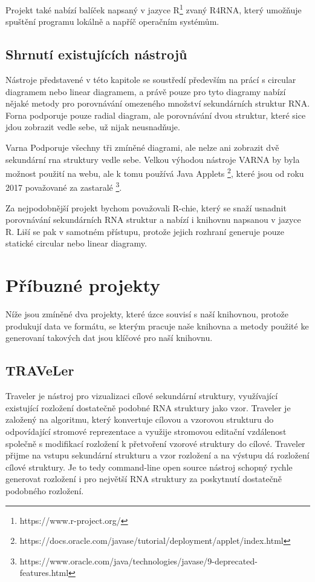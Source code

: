 Projekt také nabízí balíček napsaný v jazyce
R\footnote{https://www.r-project.org/} zvaný R4RNA, který umožňuje spuštění
programu lokálně a napříč operačním systémům.

\subsection{Shrnutí existujících nástrojů}

Nástroje představené v této kapitole se soustředí především na prácí s circular
diagramem nebo linear diagramem, a právě pouze pro tyto diagramy nabízí nějaké
metody pro porovnávání omezeného množství sekundárních struktur RNA. Forna
podporuje pouze radial diagram, ale porovnávání dvou struktur, které sice jdou
zobrazit vedle sebe, už nijak neusnadňuje. 

Varna Podporuje všechny tři zmíněné diagrami, ale nelze ani zobrazit dvě
sekundární rna struktury vedle sebe. Velkou výhodou nástroje VARNA by byla
možnost použití na webu, ale k tomu používá Java Applets
\footnote{https://docs.oracle.com/javase/tutorial/deployment/applet/index.html},
které jsou od roku 2017 považované za zastaralé
\footnote{https://www.oracle.com/java/technologies/javase/9-deprecated-features.html}.

Za nejpodobnější projekt bychom považovali R-chie, který se snaží usnadnit
porovnávání sekundárních RNA struktur a nabízí i knihovnu napsanou v jazyce R.
Liší se pak v samotném přístupu, protože jejich rozhraní generuje pouze
statické circular nebo linear diagramy.

\section{Příbuzné projekty} 

Níže jsou zmíněné dva projekty, které úzce souvisí s naší knihovnou, protože
produkují data ve formátu, se kterým pracuje naše knihovna a metody
použité ke generovaní takových dat jsou klíčové pro naší knihovnu.

\subsection{TRAVeLer} 

Traveler\cite{Traveler2017} je nástroj pro vizualizaci cílové sekundární
struktury, využívající existující rozložení dostatečně podobné RNA struktury
jako vzor. Traveler je založený na algoritmu, který konvertuje cílovou a
vzorovou strukturu do odpovídající stromové reprezentace a využije stromovou
editační vzdálenost společně s modifikací rozložení k přetvoření vzorové
struktury do cílové. Traveler přijme na vstupu sekundární strukturu a vzor
rozložení a na výstupu dá rozložení cílové struktury. Je to tedy command-line
open source nástroj schopný rychle generovat rozložení i pro největší RNA
struktury za poskytnutí dostatečně podobného rozložení.

